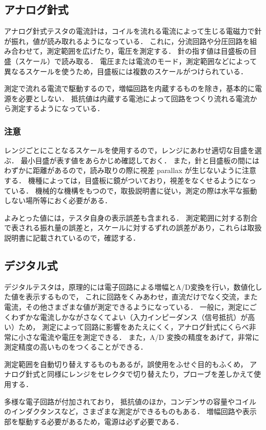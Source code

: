 \documentclass[11pt,sort]{jarticle}
\begin{document}
\subsection{アナログ針式}
アナログ針式テスタの電流計は，コイルを流れる電流によって生じる電磁力で針が振れ，値が読み取れるようになっている．
これに，分流回路や分圧回路を組み合わせて，測定範囲を広げたり，電圧を測定する．
針の指す値は目盛板の目盛（スケール）で読み取る．
電圧または電流のモード，測定範囲などによって異なるスケールを使うため，目盛板には複数のスケールがつけられている．

測定で流れる電流で駆動するので，増幅回路を内蔵するものを除き，基本的に電源を必要としない．
抵抗値は内蔵する電池によって回路をつくり流れる電流から測定するようになっている．

\subsubsection*{注意}
レンジごとにことなるスケールを使用するので，レンジにあわせ適切な目盛を選ぶ．
最小目盛が表す値をあらかじめ確認しておく．
また，針と目盛板の間にはわずかに距離があるので，読み取りの際に視差 parallax が生じないように注意する．
機種によっては，目盛板に鏡がついており，視差をなくせるようになっている．
機械的な機構をもつので，取扱説明書に従い，測定の際は水平な振動しない場所等におく必要がある．

よみとった値には，テスタ自身の表示誤差も含まれる．
測定範囲に対する割合で表される振れ量の誤差と，スケールに対するずれの誤差があり，これらは取扱説明書に記載されているので，確認する．


\subsection{デジタル式}
デジタルテスタは，原理的には電子回路による増幅とA/D変換を行い，数値化した値を表示するもので，
これに回路をくみあわせ，直流だけでなく交流，また電流，その他さまざまな値が測定できるようになっている．
一般に，測定にごくわずかな電流しかながさなくてよい（入力インピーダンス（信号抵抗）が高い）ため，
測定によって回路に影響をあたえにくく，アナログ針式にくらべ非常に小さな電流や電圧を測定できる．
また，A/D 変換の精度をあげて，非常に測定精度の高いものをつくることができる．

測定範囲を自動切り替えするものもあるが，誤使用をふせぐ目的もふくめ，
アナログ針式と同様にレンジをセレクタで切り替えたり，プローブを差しかえて使用する．

多様な電子回路が付加されており，
抵抗値のほか，コンデンサの容量やコイルのインダクタンスなど，さまざまな測定ができるものもある．
増幅回路や表示部を駆動する必要があるため，電源は必ず必要である．
\end{document}
